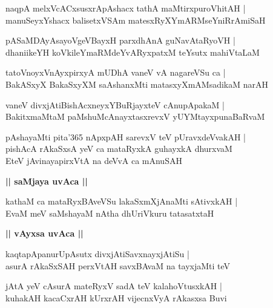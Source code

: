 \documentclass[twoside,12pt,openright]{book}
\newcounter{shloka}[chapter]
\def\uvaca#1{\centerline{{\large\textbf{#1}}}}
\begin{document}
\begin{shloka}%
naqpA melxVcACxsusxrApAshacx tathA maMtirxpuroVhitAH |\\
manuSeyxYshacx balisetxVSAm matesxRyXYmARMseYniRrAmiSaH 
\end{shloka}

\begin{shloka}%
pASaMDAyAsayoVgeVBayxH parxdhAnA guNavAtaRyoVH |\\
dhaniikeYH koVkileYmaRMdeYvARyxpatxM teYsutx mahiVtaLaM
\end{shloka}

\begin{shloka}%
tatoVnoyxVnAyxpirxyA mUDhA vaneV vA nagareVSu ca |\\
BakASxyX BakaSxyXM saAshanxMti matasxyXmAMsadikaM narAH 
\end{shloka}

\begin{shloka}%
vaneV divxjAtiBishAcxneyxYBuRjayxteV cAnupApakaM |\\
BakitxmaMtaM paMshuMcAnayxtasxrevxV yUYMtayxpunaBaRvaM 
\end{shloka}

\begin{shloka}%
pAshayaMti pita\char'365 nApxpAH sarevxV teV pUravxdeVvakAH |\\
pishAcA rAkaSxsA yeV ca mataRyxkA guhayxkA dhurxvaM \\
EteV jAvinayapirxVtA na deVvA ca mAnuSAH 
\end{shloka}

\uvaca{|| saMjaya uvAca ||}

\begin{shloka}%
kathaM ca mataRyxBAveVSu lakaSxmXjAnaMti sAtivxkAH |\\
EvaM meV saMshayaM nAtha dhUriVkuru tatasatxtaH 
\end{shloka}

\uvaca{|| vAyxsa uvAca ||}

\begin{shloka}%
kaqtapApanurUpAsutx divxjAtiSavxnayxjAtiSu |\\
asurA rAkaSxSAH perxVtAH savxBAvaM na tayxjaMti teV 
\end{shloka}

\begin{shloka}%
jAtA yeV cAsurA mateRyxV sadA teV kalahoVtusxkAH |\\
kuhakAH kacaCxrAH kUrxrAH vijecnxVyA rAkasxsa Buvi
\end{shloka}
\end{document}

